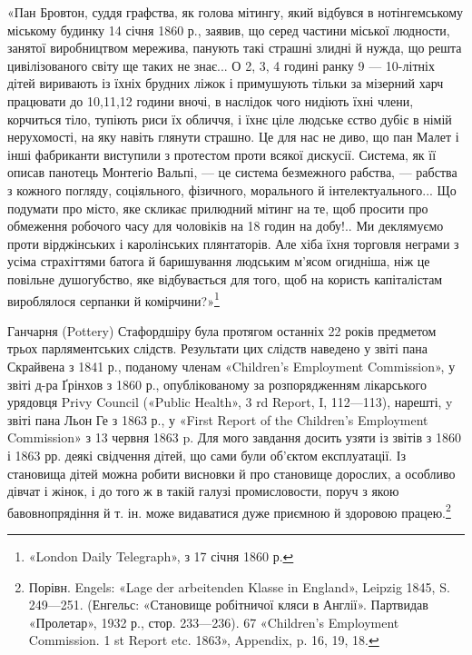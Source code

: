 «Пан Бровтон, суддя графства, як голова мітингу, який
відбувся в нотінгемському міському будинку 14 січня 1860 р.,
заявив, що серед частини міської людности, занятої виробництвом
мережива, панують такі страшні злидні й нужда, що решта цивілізованого
світу ще таких не знає... О 2, 3, 4 годині ранку 9 —
10-літніх дітей виривають із їхніх брудних ліжок і примушують
тільки за мізерний харч працювати до 10,11,12 години вночі,
в наслідок чого нидіють їхні члени, корчиться тіло, тупіють риси
їх обличчя, і їхнє ціле людське єство дубіє в німій нерухомості, на
яку навіть глянути страшно. Це для нас не диво, що пан Малет
і інші фабриканти виступили з протестом проти всякої дискусії.
Система, як її описав панотець Монтегіо Вальпі, — це система безмежного
рабства, — рабства з кожного погляду, соціяльного, фізичного,
морального й інтелектуального... Що подумати про місто,
яке скликає прилюдний мітинг на те, щоб просити про обмеження
робочого часу для чоловіків на 18 годин на добу!.. Ми деклямуємо
проти вірджінських і каролінських плянтаторів. Але хіба їхня
торговля неграми з усіма страхіттями батога й баришування людським
м’ясом огидніша, ніж це повільне душогубство, яке відбувається
для того, щоб на користь капіталістам вироблялося
серпанки й комірчини?»\footnote{
«London Daily Telegraph», з 17 січня 1860 р.
}

Ганчарня (Pottery) Стафордшіру була протягом останніх
22 років предметом трьох парляментських слідств. Результати
цих слідств наведено у звіті пана Скрайвена з 1841 р., поданому
членам «Children’s Employment Commission», у звіті д-ра
Ґрінхов з 1860 р., опублікованому за розпорядженням лікарського
урядовця Privy Council («Public Health», 3 rd Report,
I, 112—113), нарешті, y звіті пана Льон Ге з 1863 р., у «First
Report of the Children’s Employment Commission» з 13 червня
1863 p. Для мого завдання досить узяти із звітів з 1860 і 1863 рр.
деякі свідчення дітей, що сами були об’єктом експлуатації. Із
становища дітей можна робити висновки й про становище дорослих,
а особливо дівчат і жінок, і до того ж в такій галузі промисловости,
поруч з якою бавовнопрядіння й т. ін. може видаватися
дуже приємною й здоровою працею.\footnote{
Порівн. Engels: «Lage der arbeitenden Klasse in England»,
Leipzig 1845, S. 249—251. (Енгельс: «Становище робітничої кляси в
Англії». Партвидав «Пролетар», 1932 р., стор. 233—236).
67 «Children’s Employment Commission. 1 st Report etc. 1863», Appendix,
p. 16, 19, 18.
}

